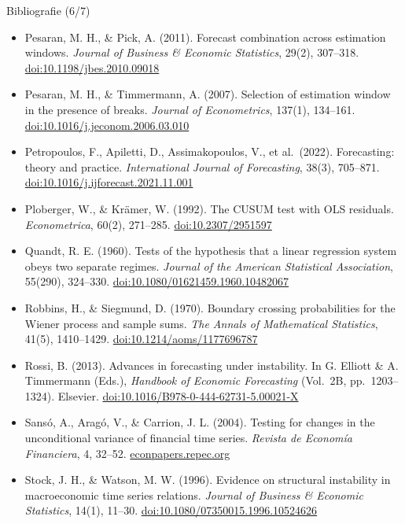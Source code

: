 \begin{frame}{Bibliografie (6/7)}
\itemsize{\tiny}
\begin{itemize}
    \item Pesaran, M. H., \& Pick, A. (2011). Forecast combination across estimation windows. \textit{Journal of Business \& Economic Statistics}, 29(2), 307--318. \href{https://doi.org/10.1198/jbes.2010.09018}{doi:10.1198/jbes.2010.09018}
    \item Pesaran, M. H., \& Timmermann, A. (2007). Selection of estimation window in the presence of breaks. \textit{Journal of Econometrics}, 137(1), 134--161. \href{https://doi.org/10.1016/j.jeconom.2006.03.010}{doi:10.1016/j.jeconom.2006.03.010}
    \item Petropoulos, F., Apiletti, D., Assimakopoulos, V., et al.\ (2022). Forecasting: theory and practice. \textit{International Journal of Forecasting}, 38(3), 705--871. \href{https://doi.org/10.1016/j.ijforecast.2021.11.001}{doi:10.1016/j.ijforecast.2021.11.001}
    \item Ploberger, W., \& Krämer, W. (1992). The CUSUM test with OLS residuals. \textit{Econometrica}, 60(2), 271--285. \href{https://doi.org/10.2307/2951597}{doi:10.2307/2951597}
    \item Quandt, R. E. (1960). Tests of the hypothesis that a linear regression system obeys two separate regimes. \textit{Journal of the American Statistical Association}, 55(290), 324--330. \href{https://doi.org/10.1080/01621459.1960.10482067}{doi:10.1080/01621459.1960.10482067}
    \item Robbins, H., \& Siegmund, D. (1970). Boundary crossing probabilities for the Wiener process and sample sums. \textit{The Annals of Mathematical Statistics}, 41(5), 1410--1429. \href{https://doi.org/10.1214/aoms/1177696787}{doi:10.1214/aoms/1177696787}
    \item Rossi, B. (2013). Advances in forecasting under instability. In G. Elliott \& A. Timmermann (Eds.), \textit{Handbook of Economic Forecasting} (Vol.\ 2B, pp.\ 1203--1324). Elsevier. \href{https://doi.org/10.1016/B978-0-444-62731-5.00021-X}{doi:10.1016/B978-0-444-62731-5.00021-X}
    \item Sansó, A., Aragó, V., \& Carrion, J. L. (2004). Testing for changes in the unconditional variance of financial time series. \textit{Revista de Economía Financiera}, 4, 32--52. \href{https://econpapers.repec.org/RePEc:ubi:deawps:5}{econpapers.repec.org}
    \item Stock, J. H., \& Watson, M. W. (1996). Evidence on structural instability in macroeconomic time series relations. \textit{Journal of Business \& Economic Statistics}, 14(1), 11--30. \href{https://doi.org/10.1080/07350015.1996.10524626}{doi:10.1080/07350015.1996.10524626}

\end{itemize}
\end{frame}
